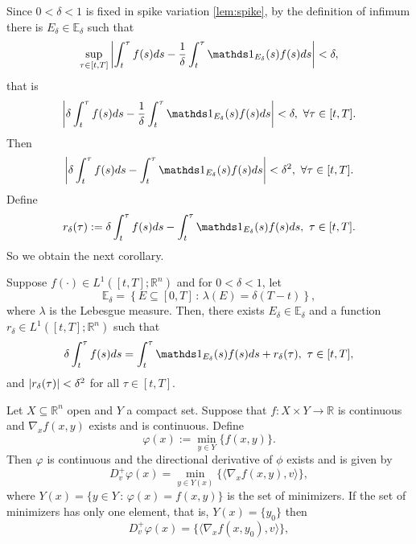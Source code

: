     Since $0<\delta <1$ is fixed in spike variation \cref{lem:spike}, by the
    definition of infimum there is $E_\delta \in \mathbb{E}_{\delta}$ such that
    \begin{equation*}
        \sup_{\tau \in [t,T]} \abs{\int_{t}^{\tau} f(s)ds - %
        \frac{1}{\delta}\int_{t}^{\tau} \ind_{E_\delta}(s)f(s)ds} < \delta,
    \end{equation*}
    that is 
    $$
        \abs{\delta \int_{t}^{\tau}f(s)ds - \frac{1}{\delta}\int_{t}^{\tau} %
        \ind_{E_\delta}(s)f(s)ds} < \delta, \, \, \forall \tau \in [t,T].
    $$
    Then
    $$
        \abs{\delta \int_{t}^{\tau} f(s)ds - \int_{t}^{\tau} \ind_{E_\delta}(s)%
        f(s)ds} < \delta^2, \, \, \forall \tau \in [t,T].
    $$
    Define 
    $$
        r_{\delta}(\tau) := \delta \int_{t}^{\tau}f(s)ds - %
        \int_{t}^{\tau}\ind_{E_\delta}(s)f(s)ds, \, \, \tau \in [t,T].
    $$
    So we obtain the next corollary.
    \begin{corollary}\label{cor:spike}
        Suppose $f(\cdot) \in L^{1}([t,T] ; \mathbb{R}^{n})$ and for
        $0 < \delta < 1$, let
        $$
            \mathbb{E}_{\delta} = \left \{ E \subseteq [0,T] \, : \, %
                \lambda(E) = \delta (T-t)  \right\},
        $$
        where $\lambda$ is the Lebesgue measure. Then, there exists 
        $E_\delta \in \mathbb{E}_{\delta}$ and a function $
        r_\delta \in L^{1}([t,T] ; \mathbb{R}^{n}) $ such that 
        \begin{equation*}
            \delta\int_{t}^{\tau}f(s)ds = \int_{t}^{\tau} \ind_{E_\delta}(s)%
            f(s)ds + r_\delta(\tau), \, \, \tau \in [t,T],
        \end{equation*}
        and $\left\lvert r_{\delta}(\tau)\right\rvert < {\delta}^2$ for all $\tau \in [t,T]$.
    \end{corollary}
    \begin{theorem}\label{thm:danskin}
        Let $X \subseteq \mathbb{R}^n$ open and $Y$ a compact set. Suppose that 
        $f : X \times Y \to \mathbb{R}$ is continuous and $\nabla_{x} f(x,y)$ 
        exists and is continuous. Define
        $$
            \varphi(x) := \min_{y \in Y} \{f(x,y)\}.
        $$
        Then $\varphi$ is continuous and the directional derivative of $\phi$ 
        exists and is given by
        $$
            D_{v}^{+}\varphi(x) = \min_{y\in Y(x)}\{\langle \nabla_{x} f(x,y), v \rangle\},
        $$
        where $Y(x) = \{y\in Y \, : \, \varphi(x) = f(x,y)\}$ is the set of 
        minimizers.
        If the set of minimizers has only one element, that is, $Y(x) = \{y_0\}$
        then
        $$ 
            D_{v}^{+}\varphi(x) = \{\langle \nabla_{x} f(x,y_0), v \rangle\},
        $$
    \end{theorem}
    
